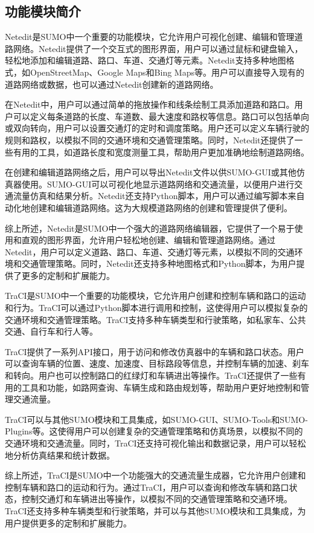 \subsection{功能模块简介}

Netedit是SUMO中一个重要的功能模块，它允许用户可视化创建、编辑和管理道路网络。Netedit提供了一个交互式的图形界面，用户可以通过鼠标和键盘输入，轻松地添加和编辑道路、路口、车道、交通灯等元素。Netedit支持多种地图格式，如OpenStreetMap、Google Maps和Bing Maps等。用户可以直接导入现有的道路网络或数据，也可以通过Netedit创建新的道路网络。

在Netedit中，用户可以通过简单的拖放操作和线条绘制工具添加道路和路口。用户可以定义每条道路的长度、车道数、最大速度和路权等信息。路口可以包括单向或双向转向，用户可以设置交通灯的定时和调度策略。用户还可以定义车辆行驶的规则和路权，以模拟不同的交通环境和交通管理策略。同时，Netedit还提供了一些有用的工具，如道路长度和宽度测量工具，帮助用户更加准确地绘制道路网络。

在创建和编辑道路网络之后，用户可以导出Netedit文件以供SUMO-GUI或其他仿真器使用。SUMO-GUI可以可视化地显示道路网络和交通流量，以便用户进行交通流量仿真和结果分析。Netedit还支持Python脚本，用户可以通过编写脚本来自动化地创建和编辑道路网络。这为大规模道路网络的创建和管理提供了便利。

综上所述，Netedit是SUMO中一个强大的道路网络编辑器，它提供了一个易于使用和直观的图形界面，允许用户轻松地创建、编辑和管理道路网络。通过Netedit，用户可以定义道路、路口、车道、交通灯等元素，以模拟不同的交通环境和交通管理策略。同时，Netedit还支持多种地图格式和Python脚本，为用户提供了更多的定制和扩展能力。

TraCI是SUMO中一个重要的功能模块，它允许用户创建和控制车辆和路口的运动和行为。TraCI可以通过Python脚本进行调用和控制，这使得用户可以模拟复杂的交通环境和交通管理策略。TraCI支持多种车辆类型和行驶策略，如私家车、公共交通、自行车和行人等。

TraCI提供了一系列API接口，用于访问和修改仿真器中的车辆和路口状态。用户可以查询车辆的位置、速度、加速度、目标路段等信息，并控制车辆的加速、刹车和转向。用户也可以控制路口的红绿灯和车辆进出等操作。TraCI还提供了一些有用的工具和功能，如路网查询、车辆生成和路由规划等，帮助用户更好地控制和管理交通流量。

TraCI可以与其他SUMO模块和工具集成，如SUMO-GUI、SUMO-Tools和SUMO-Plugins等。这使得用户可以创建复杂的交通管理策略和仿真场景，以模拟不同的交通环境和交通流量。同时，TraCI还支持可视化输出和数据记录，用户可以轻松地分析仿真结果和统计数据。

综上所述，TraCI是SUMO中一个功能强大的交通流量生成器，它允许用户创建和控制车辆和路口的运动和行为。通过TraCI，用户可以查询和修改车辆和路口状态，控制交通灯和车辆进出等操作，以模拟不同的交通管理策略和交通环境。TraCI还支持多种车辆类型和行驶策略，并可以与其他SUMO模块和工具集成，为用户提供更多的定制和扩展能力。

